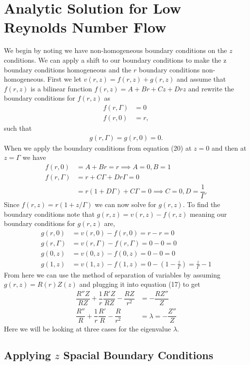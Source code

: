 \documentclass[11pt,letterpaper]{article}
\newcommand{\fpar}[1]{\left({#1}\right)} %
\begin{document}
\section{Analytic Solution for Low Reynolds Number Flow}
We begin by noting we have non-homogeneous boundary conditions on the $z$ conditions. We can apply a shift to our boundary conditions to make the z boundary conditions homogeneous and the $r$ boundary conditions non-homogeneous. First we let $v(r,z) = f(r,z)+g(r,z)$ and assume that $f(r,z)$ is a bilinear function $f(r,z) = A +Br+Cz+Drz$ and rewrite the boundary conditions for $f(r,z)$ as  
\begin{align}
      f(r,\Gamma) &= 0 \nonumber\\
      f(r,0) &= r ,
\end{align}
such that 
\begin{align}
    g(r,\Gamma) = g(r,0) = 0.
\end{align}
When we apply the boundary conditions from equation (20) at $z=0$ and then at $z=\Gamma$ we have
\begin{align*}
    f(r,0) &= A+Br = r \implies A = 0, B = 1\\
    f(r,\Gamma) &=  r +C\Gamma+Dr\Gamma = 0\\
    &= r(1+D\Gamma)+C\Gamma =0 \implies C = 0, D = \dfrac{1}{\Gamma}.
\end{align*}
Since $f(r,z) = r(1+z/\Gamma)$ we can now solve for $g(r,z)$. To find the boundary conditions note that $g(r,z) = v(r,z)-f(r,z)$ meaning our boundary conditions for $g(r,z)$ are,
\begin{align}
    g(r,0) &= v(r,0) - f(r,0) = r-r = 0\\
    g(r,\Gamma) &= v(r,\Gamma) - f(r,\Gamma) = 0-0 = 0\\
    g(0,z) &= v(0,z) - f(0,z) = 0-0 = 0\\
    g(1,z) &= v(1,z)-f(1,z) = 0 - \fpar{1- \frac{z}{\Gamma}} = \frac{z}{\Gamma} -1  
\end{align}
From here we can use the method of separation of variables by assuming $g(r,z) = R(r)Z(z)$ and plugging it into equation (17) to get 
\begin{align}
    \dfrac{R''Z}{RZ}+\dfrac{1}{r}\dfrac{R'Z}{RZ} - \dfrac{RZ}{r^2} &=- \dfrac{RZ''}{Z}\nonumber\\
    \dfrac{R''}{R}+\dfrac{1}{r}\dfrac{R'}{R} - \dfrac{R}{r^2} &=\lambda = - \dfrac{Z''}{Z}
\end{align}
Here we will be looking at three cases for the eigenvalue $\lambda$.
\subsection{Applying $z$ Spacial Boundary Conditions}
\end{document}
